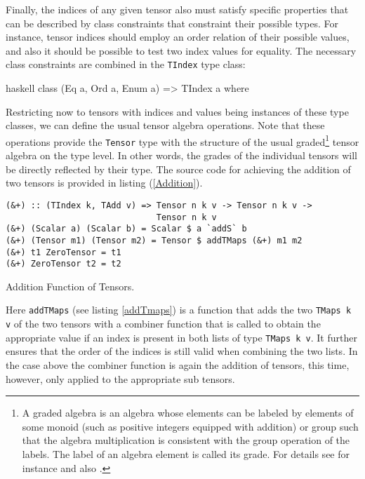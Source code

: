 Finally, the indices of any given tensor also must satisfy specific properties that can be described by class constraints that constraint their possible types. For instance, tensor indices should employ an order relation of their possible values, and also it should be possible to test two index values for equality. The necessary class constraints are combined in the \texttt{TIndex} type class:
\begin{center}
\begin{cminted}{haskell}
class (Eq a, Ord a, Enum a) => TIndex a where
\end{cminted} 
\end{center}



Restricting now to tensors with indices and values being instances of these type classes, we can define the usual tensor algebra operations.
Note that these operations provide the \texttt{Tensor} type with the structure of the usual graded\footnote{A graded algebra is an algebra whose elements can be labeled by elements of some monoid (such as positive integers equipped with addition) or group such that the algebra multiplication is consistent with the group operation of the labels. The label of an algebra element is called its grade.
For details see for instance \cite{bourbaki1998algebra} and also \cite{nlab:gradedAlg}.} tensor algebra on the type level. In other words, the grades of the individual tensors will be directly reflected by their type.
The source code for achieving the addition of two tensors is provided in listing (\ref{Addition}).
\begin{listing}[hbt!]
\begin{verbatim}
(&+) :: (TIndex k, TAdd v) => Tensor n k v -> Tensor n k v ->
                              Tensor n k v
(&+) (Scalar a) (Scalar b) = Scalar $ a `addS` b
(&+) (Tensor m1) (Tensor m2) = Tensor $ addTMaps (&+) m1 m2
(&+) t1 ZeroTensor = t1
(&+) ZeroTensor t2 = t2
\end{verbatim} 
\caption{Addition Function of Tensors.}\label{Addition}
\end{listing}
Here \texttt{addTMaps} (see listing \ref{addTmaps}) is a function that adds the two \texttt{TMaps k v} of the two tensors with a combiner function that is called to obtain the appropriate value if an index is present in both lists of type \texttt{TMaps k v}. It further ensures that the order of the indices is still valid when combining the two lists. In the case above the combiner function is again the addition of tensors, this time, however, only applied to the appropriate sub tensors. 

